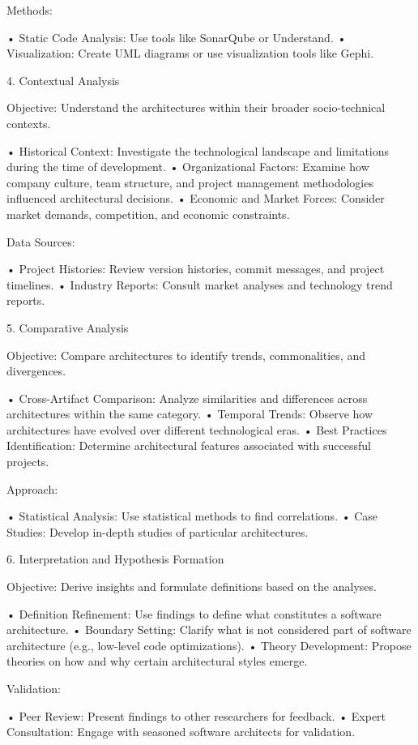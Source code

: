 Methods:

	•	Static Code Analysis: Use tools like SonarQube or Understand.
	•	Visualization: Create UML diagrams or use visualization tools like Gephi.

4. Contextual Analysis

Objective: Understand the architectures within their broader socio-technical contexts.

	•	Historical Context: Investigate the technological landscape and limitations during the time of development.
	•	Organizational Factors: Examine how company culture, team structure, and project management methodologies influenced architectural decisions.
	•	Economic and Market Forces: Consider market demands, competition, and economic constraints.

Data Sources:

	•	Project Histories: Review version histories, commit messages, and project timelines.
	•	Industry Reports: Consult market analyses and technology trend reports.

5. Comparative Analysis

Objective: Compare architectures to identify trends, commonalities, and divergences.

	•	Cross-Artifact Comparison: Analyze similarities and differences across architectures within the same category.
	•	Temporal Trends: Observe how architectures have evolved over different technological eras.
	•	Best Practices Identification: Determine architectural features associated with successful projects.

Approach:

	•	Statistical Analysis: Use statistical methods to find correlations.
	•	Case Studies: Develop in-depth studies of particular architectures.

6. Interpretation and Hypothesis Formation

Objective: Derive insights and formulate definitions based on the analyses.

	•	Definition Refinement: Use findings to define what constitutes a software architecture.
	•	Boundary Setting: Clarify what is not considered part of software architecture (e.g., low-level code optimizations).
	•	Theory Development: Propose theories on how and why certain architectural styles emerge.

Validation:

	•	Peer Review: Present findings to other researchers for feedback.
	•	Expert Consultation: Engage with seasoned software architects for validation.

